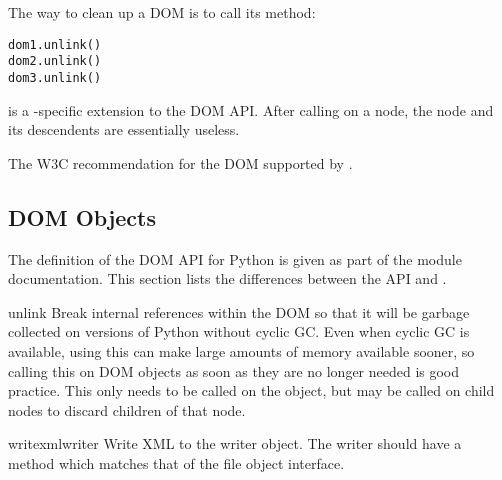 The way to clean up a DOM is to call its  method:

\begin{verbatim}
dom1.unlink()
dom2.unlink()
dom3.unlink()
\end{verbatim}

 is a -specific extension to
the DOM API.  After calling  on a node, the node and
its descendents are essentially useless.

\begin{seealso}
           {The W3C recommendation for the
            DOM supported by .}
\end{seealso}


\subsection{DOM Objects \label{dom-objects}}

The definition of the DOM API for Python is given as part of the
 module documentation.  This section lists the
differences between the API and .


\begin{methoddesc}{unlink}{}
Break internal references within the DOM so that it will be garbage
collected on versions of Python without cyclic GC.  Even when cyclic
GC is available, using this can make large amounts of memory available
sooner, so calling this on DOM objects as soon as they are no longer
needed is good practice.  This only needs to be called on the
 object, but may be called on child nodes to discard
children of that node.
\end{methoddesc}

\begin{methoddesc}{writexml}{writer}
Write XML to the writer object.  The writer should have a
 method which matches that of the file object
interface.



\end{methoddesc}


